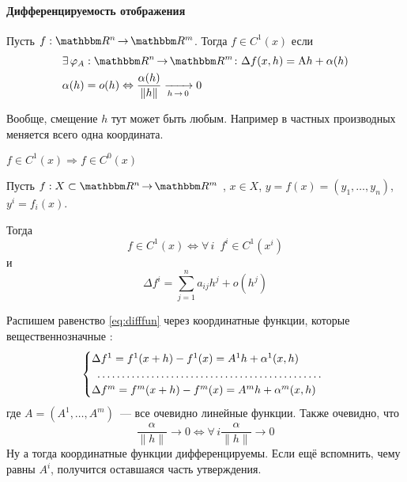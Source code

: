 \documentclass[12pt]{../../notes}
\begin{document}
\paragraph{Дифференцируемость отображения}
\begin{defn}\label{defn:diffRn}
  Пусть $f:\R^n \to \R^m$. Тогда $f\in C^1(x)$ если 
  \begin{align}
    & \exists\, \varphi_A:\R^n \to \R^m \colon \Delta f(x,h) = \mathrm{A} h + \alpha(h)\label{eq:difffun} \\
    & \alpha(h) = o(h) \Leftrightarrow \frac{\alpha(h)}{\|h\|} \xrightarrow[h\to 0]{} 0
  \end{align}
\end{defn}
\begin{rem*}
  Вообще, смещение $h$ тут может быть любым. Например в частных производных меняется всего одна координата.
\end{rem*}

\begin{stat}\label{stat:diffcontRn}
  $f \in C^1(x) \Rightarrow f \in C^0(x)$
\end{stat}

\begin{stat}\label{stat:diffcorrd}
  Пусть $f: X \subset \R^n \to \R^m$ , $x\in X$, $y = f(x) = (y_1,\dotsc,y_n)$, $y^i = f_i(x)$.
  
  Тогда 
  \[
    f\in C^1(x) \Leftrightarrow \forall\, i \;\: f^i \in C^1 (x^i)
  \] и 
  \[
    \Delta f^i = \sum_{j=1}^{n} a_{ij}h^j + o(h^j)
  \]
\end{stat}

\begin{itlproof}
  Распишем равенство \eqref{eq:difffun} через координатные функции, которые вещественнозначные :
  \[
    \begin{cases}
      \Delta f^1 = f^1(x + h) - f^1(x) = A^1 h + \alpha^1(x,h)&\\
      \hdotsfor{1} &\\
      \Delta f^m = f^m(x + h) - f^m(x) = A^m h + \alpha^m(x,h)&
    \end{cases}
  \]
  где $A = (A^1, \dotsc, A^m)$~--- все очевидно линейные функции. Также очевидно, что 
  \[
    \frac{\alpha}{\|h\|} \to 0 \Leftrightarrow \forall\, i \frac{\alpha}{\|h\|} \to 0 
  \]
  Ну а тогда координатные функции дифференцируемы.
  Если ещё вспомнить, чему равны $A^i$, получится оставшаяся часть утверждения.
\end{itlproof}
\end{document}
